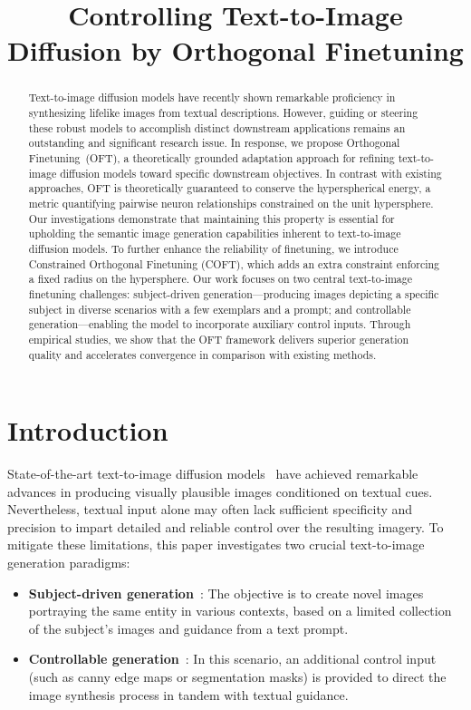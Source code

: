 \title{Controlling Text-to-Image Diffusion by Orthogonal Finetuning}

\begin{abstract}
Text-to-image diffusion models have recently shown remarkable proficiency in synthesizing lifelike images from textual descriptions. However, guiding or steering these robust models to accomplish distinct downstream applications remains an outstanding and significant research issue. In response, we propose Orthogonal Finetuning~(OFT), a theoretically grounded adaptation approach for refining text-to-image diffusion models toward specific downstream objectives. In contrast with existing approaches, OFT is theoretically guaranteed to conserve the hyperspherical energy, a metric quantifying pairwise neuron relationships constrained on the unit hypersphere. Our investigations demonstrate that maintaining this property is essential for upholding the semantic image generation capabilities inherent to text-to-image diffusion models. To further enhance the reliability of finetuning, we introduce Constrained Orthogonal Finetuning (COFT), which adds an extra constraint enforcing a fixed radius on the hypersphere. Our work focuses on two central text-to-image finetuning challenges: subject-driven generation—producing images depicting a specific subject in diverse scenarios with a few exemplars and a prompt; and controllable generation—enabling the model to incorporate auxiliary control inputs. Through empirical studies, we show that the OFT framework delivers superior generation quality and accelerates convergence in comparison with existing methods.
\end{abstract}

\section{Introduction}

State-of-the-art text-to-image diffusion models~\cite{saharia2022photorealistic,ramesh2022hierarchical,rombach2022high} have achieved remarkable advances in producing visually plausible images conditioned on textual cues. Nevertheless, textual input alone may often lack sufficient specificity and precision to impart detailed and reliable control over the resulting imagery. To mitigate these limitations, this paper investigates two crucial text-to-image generation paradigms:

\begin{itemize}[leftmargin=*,nosep]

    \item \textbf{Subject-driven generation}~\cite{ruiz2023dreambooth}: The objective is to create novel images portraying the same entity in various contexts, based on a limited collection of the subject’s images and guidance from a text prompt.
    \item \textbf{Controllable generation}~\cite{zhang2023adding,mou2023t2i}: In this scenario, an additional control input (such as canny edge maps or segmentation masks) is provided to direct the image synthesis process in tandem with textual guidance.
\end{itemize}


